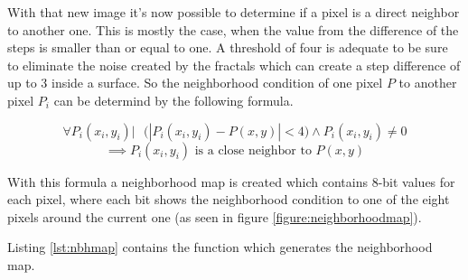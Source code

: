 With that new image it's now possible to determine if a pixel is a direct neighbor to another one. This is mostly the case,
when the value from the difference of the steps is smaller than or equal to one. A threshold of four is adequate to be sure 
to eliminate the noise created by the fractals which can create a step difference of up to 3 inside a surface. 
So the neighborhood condition of one pixel $P$ to another pixel $P_i$ can be determind by the following formula.

\[
 \forall P_i(x_i,y_i)  |\mbox{   }
 \Big(\left|P_i(x_i,y_i)-P(x,y)\right|<4 \Big) \wedge  P_i(x_i,y_i) \neq 0 %
\]
\[
 \implies P_i(x_i,y_i) \mbox{ is a close neighbor to } P(x,y)
\]

With this formula a neighborhood map is created which contains 8-bit values for each pixel, where each bit shows the neighborhood 
condition to one of the eight pixels around the current one (as seen in figure \vref{figure:neighborhoodmap}).

Listing \vref{lst:nbhmap} contains the function which generates the neighborhood map.

